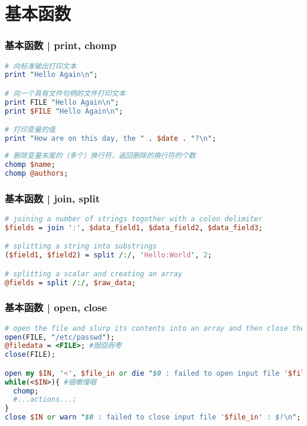 \section{基本函数}
\begin{frame}[fragile]
  \frametitle{基本函数 | \alert{print, chomp}}
  \vspace{-1.5em}
\begin{lstlisting}[language=Perl]
# 向标准输出打印文本
print "Hello Again\n";

# 向一个具有文件句柄的文件打印文本
print FILE "Hello Again\n";
print $FILE "Hello Again\n";

# 打印变量的值
print "How are on this day, the " . $date . "?\n";
\end{lstlisting}
\pause
\begin{lstlisting}[language=Perl]
# 删除变量末尾的（多个）换行符，返回删除的换行符的个数
chomp $name;
chomp @authors;
\end{lstlisting}
\end{frame}

\begin{frame}[fragile]
  \frametitle{基本函数 | \alert{join, split}}
  \vspace{-1.5em}
\begin{lstlisting}[language=Perl]
# joining a number of strings togother with a colon delimiter
$fields = join ':', $data_field1, $data_field2, $data_field3;

# splitting a string into substrings
($field1, $field2) = split /:/, 'Hello:World', 2;

# splitting a scalar and creating an array
@fields = split /:/, $raw_data;
\end{lstlisting}
\end{frame}

\begin{frame}[fragile]
  \frametitle{基本函数 | \alert{open, close}}
  \vspace{-1.5em}
\begin{lstlisting}[language=Perl]
# open the file and slurp its contents into an array and then close the file
open(FILE, "/etc/passwd");
@filedata = <FILE>; #囫囵吞枣
close(FILE);

open my $IN, '<', $file_in or die "$0 : failed to open input file '$file_in' : $!\n";
while(<$IN>){ #细嚼慢咽
  chomp;
  #...actions...;
}
close $IN or warn "$0 : failed to close input file '$file_in' : $!\n";
\end{lstlisting}
\end{frame}

